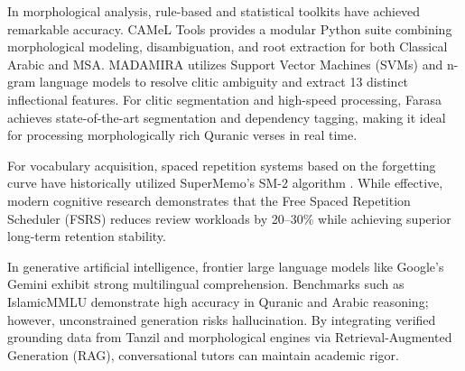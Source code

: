 \documentclass[A4paper,12pt]{article}
\begin{document}
In morphological analysis, rule-based and statistical toolkits have achieved remarkable accuracy. CAMeL Tools \cite{obeid2020camel} provides a modular Python suite combining morphological modeling, disambiguation, and root extraction for both Classical Arabic and MSA. MADAMIRA \cite{pasha2014madamira} utilizes Support Vector Machines (SVMs) and n-gram language models to resolve clitic ambiguity and extract 13 distinct inflectional features. For clitic segmentation and high-speed processing, Farasa \cite{abdelali2016farasa} achieves state-of-the-art segmentation and dependency tagging, making it ideal for processing morphologically rich Quranic verses in real time.

For vocabulary acquisition, spaced repetition systems based on the forgetting curve have historically utilized SuperMemo's SM-2 algorithm \cite{wozniak1990sm2}. While effective, modern cognitive research demonstrates that the Free Spaced Repetition Scheduler (FSRS) \cite{ye2024fsrs} reduces review workloads by 20--30\% while achieving superior long-term retention stability.

In generative artificial intelligence, frontier large language models like Google's Gemini \cite{gemini2024} exhibit strong multilingual comprehension. Benchmarks such as IslamicMMLU demonstrate high accuracy in Quranic and Arabic reasoning; however, unconstrained generation risks hallucination. By integrating verified grounding data from Tanzil \cite{tanzil2024} and morphological engines via Retrieval-Augmented Generation (RAG), conversational tutors can maintain academic rigor.
\end{document}
